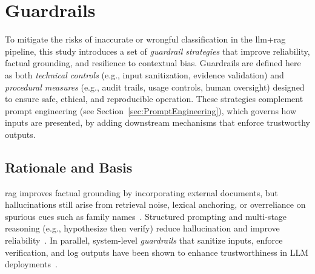 \section{Guardrails}\label{sec:Guardrails}
To mitigate the risks of inaccurate or wrongful classification in the \gls{llm}+\gls{rag} pipeline,
this study introduces a set of \emph{guardrail strategies} that improve reliability, factual
grounding, and resilience to contextual bias. Guardrails are defined here as both \emph{technical
      controls} (e.g., input sanitization, evidence validation) and \emph{procedural measures} (e.g.,
audit trails, usage controls, human oversight) designed to ensure safe, ethical, and reproducible
operation. These strategies complement prompt engineering (see
Section~\ref{sec:PromptEngineering}), which governs how inputs are presented, by adding downstream
mechanisms that enforce trustworthy outputs.

\subsection{Rationale and Basis}
\gls{rag} improves factual grounding by incorporating external documents, but hallucinations
still arise from retrieval noise, lexical anchoring, or overreliance on spurious cues such as family
names~\cite{zhang2025hallucination}. Structured prompting and multi-stage reasoning (e.g.,
hypothesize then verify) reduce hallucination and improve reliability~\cite{bechard2024reducing, lee2025finetune}.
In parallel, system-level \emph{guardrails} that sanitize inputs, enforce verification, and log
outputs have been shown to enhance trustworthiness in LLM deployments~\cite{han2025guardrail, magesh2025assessing}.


